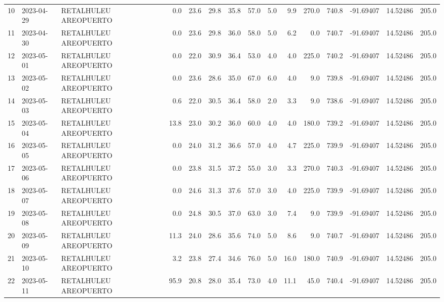 \documentclass[12pt]{article}
\begin{document}
\begin{center}
\begin{tabular}{lllrrrrrrrrrrrr}
10  & 2023-04-29 &  RETALHULEU AREOPUERTO &     0.0 &  23.6 &   29.8 &  35.8 &     57.0 &  5.0 &         9.9 &       270.0 &      740.8 & -91.69407 &  14.52486 &    205.0 \\
11  & 2023-04-30 &  RETALHULEU AREOPUERTO &     0.0 &  23.6 &   29.8 &  36.0 &     58.0 &  5.0 &         6.2 &         0.0 &      740.7 & -91.69407 &  14.52486 &    205.0 \\
12  & 2023-05-01 &  RETALHULEU AREOPUERTO &     0.0 &  22.0 &   30.9 &  36.4 &     53.0 &  4.0 &         4.0 &       225.0 &      740.2 & -91.69407 &  14.52486 &    205.0 \\
13  & 2023-05-02 &  RETALHULEU AREOPUERTO &     0.0 &  23.6 &   28.6 &  35.0 &     67.0 &  6.0 &         4.0 &         9.0 &      739.8 & -91.69407 &  14.52486 &    205.0 \\
14  & 2023-05-03 &  RETALHULEU AREOPUERTO &     0.6 &  22.0 &   30.5 &  36.4 &     58.0 &  2.0 &         3.3 &         9.0 &      738.6 & -91.69407 &  14.52486 &    205.0 \\
15  & 2023-05-04 &  RETALHULEU AREOPUERTO &    13.8 &  23.0 &   30.2 &  36.0 &     60.0 &  4.0 &         4.0 &       180.0 &      739.2 & -91.69407 &  14.52486 &    205.0 \\
16  & 2023-05-05 &  RETALHULEU AREOPUERTO &     0.0 &  24.0 &   31.2 &  36.6 &     57.0 &  4.0 &         4.7 &       225.0 &      739.9 & -91.69407 &  14.52486 &    205.0 \\
17  & 2023-05-06 &  RETALHULEU AREOPUERTO &     0.0 &  23.8 &   31.5 &  37.2 &     55.0 &  3.0 &         3.3 &       270.0 &      740.3 & -91.69407 &  14.52486 &    205.0 \\
18  & 2023-05-07 &  RETALHULEU AREOPUERTO &     0.0 &  24.6 &   31.3 &  37.6 &     57.0 &  3.0 &         4.0 &       225.0 &      739.9 & -91.69407 &  14.52486 &    205.0 \\
19  & 2023-05-08 &  RETALHULEU AREOPUERTO &     0.0 &  24.8 &   30.5 &  37.0 &     63.0 &  3.0 &         7.4 &         9.0 &      739.9 & -91.69407 &  14.52486 &    205.0 \\
20  & 2023-05-09 &  RETALHULEU AREOPUERTO &    11.3 &  24.0 &   28.6 &  35.6 &     74.0 &  5.0 &         8.6 &         9.0 &      740.7 & -91.69407 &  14.52486 &    205.0 \\
21  & 2023-05-10 &  RETALHULEU AREOPUERTO &     3.2 &  23.8 &   27.4 &  34.6 &     76.0 &  5.0 &        16.0 &       180.0 &      740.9 & -91.69407 &  14.52486 &    205.0 \\
22  & 2023-05-11 &  RETALHULEU AREOPUERTO &    95.9 &  20.8 &   28.0 &  35.4 &     73.0 &  4.0 &        11.1 &        45.0 &      740.4 & -91.69407 &  14.52486 &    205.0 \\

\end{tabular}
\end{center}
\end{document}
